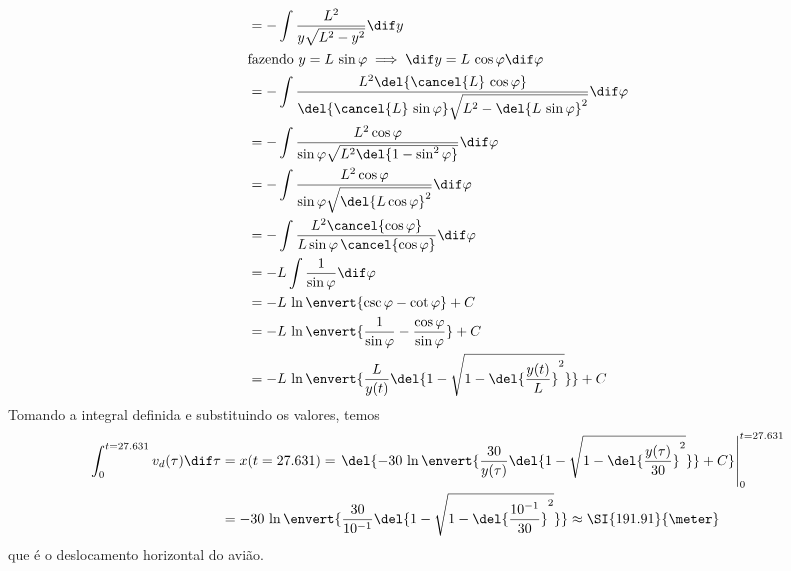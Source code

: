 \documentclass[]{IMTexam}
\begin{document}
\begin{questions}
\begin{solution}
\begin{align*}
			                  & =-\int\dfrac{L^{2}}{y\sqrt{L^{2}-y^{2}}}\dif y                                 \\
			\intertext{fazendo $ y=L\,\sin\varphi\implies \dif y=L\,\cos\varphi\dif\varphi $}
			                  & =-\int\dfrac{L^{2}\del{\cancel{L}\,\cos\varphi}}
			{\del{\cancel{L}\,\sin\varphi}\sqrt{L^{2}-\del{L\,\sin\varphi}^{2}}}\dif\varphi                    \\
			                  & =-\int\dfrac{L^{2}\cos\varphi}
			{\sin\varphi\sqrt{L^{2}\del{1-\sin^{2}\varphi}}}\dif\varphi                                        \\
			                  & =-\int\dfrac{L^{2}\cos\varphi}
			{\sin\varphi\sqrt{\del{L\cos\varphi}^{2}}}\dif\varphi                                              \\
			                  & =-\int\dfrac{L^{2}\cancel{\cos\varphi}}
			{L\sin\varphi\,\cancel{\cos\varphi}}\dif\varphi                                                    \\
			                  & =-L\int\dfrac{1}
			{\sin\varphi}\dif\varphi                                                                           \\
			                  & =-L\,\ln{\envert{\csc\varphi-\cot\varphi}}+C                                   \\
			                  & =-L\,\ln{\envert{\dfrac{1}{\sin\varphi}-\dfrac{\cos\varphi}{\sin\varphi}}}+C   \\
			                  & =-L\,\ln{\envert{\dfrac{L}{y(t)}\del{1-\sqrt{1-\del{\dfrac{y(t)}{L}}^{2}}}}}+C
		\end{align*}
		Tomando a integral definida e substituindo os valores, temos
		\begin{align*}
			\int_{0}^{t=27.631} v_d(\tau)\dif \tau & =x(t=27.631)=\left. \del{-30\,\ln{\envert{\dfrac{30}{y(\tau)}\del{1-\sqrt{1-\del{\dfrac{y(\tau)}{30}}^{2}}}}}+C}\right|_{0}^{t=27.631} \\
			                                       & =-30\,\ln{\envert{\dfrac{30}{10^{-1}}\del{1-\sqrt{1-\del{\dfrac{10^{-1}}{30}}^{2}}}}}\approx \SI{191.91}{\meter}
		\end{align*}
		que é o deslocamento horizontal do avião.

	\end{solution}

\end{questions}
\end{document}
